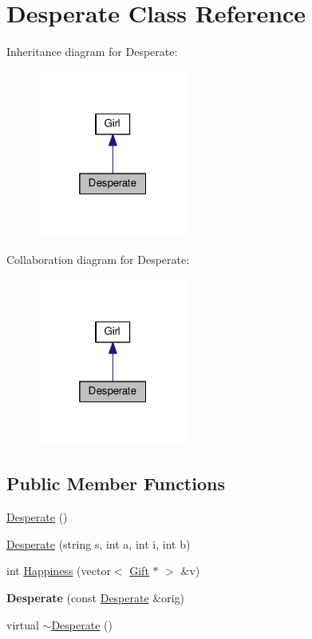 \hypertarget{class_desperate}{\section{Desperate Class Reference}
\label{class_desperate}
}


Inheritance diagram for Desperate\-:
\nopagebreak
\begin{figure}[H]
\begin{center}
\leavevmode
\includegraphics[width=140pt]{class_desperate__inherit__graph}
\end{center}
\end{figure}


Collaboration diagram for Desperate\-:
\nopagebreak
\begin{figure}[H]
\begin{center}
\leavevmode
\includegraphics[width=140pt]{class_desperate__coll__graph}
\end{center}
\end{figure}
\subsection*{Public Member Functions}
\begin{DoxyCompactItemize}
\item 
\hyperlink{class_desperate_a5a966ea58805cde02bbef8ce14fc1113}{Desperate} ()
\item 
\hyperlink{class_desperate_aac873bd417b8de2eab9ca2ed5d50a482}{Desperate} (string s, int a, int i, int b)
\item 
int \hyperlink{class_desperate_ae51a841b9720b3068c7c35b4ad53604f}{Happiness} (vector$<$ \hyperlink{class_gift}{Gift} $\ast$ $>$ \&v)
\item 
\hypertarget{class_desperate_a992a359206f71044233d89c3eca11137}{{\bfseries Desperate} (const \hyperlink{class_desperate}{Desperate} \&orig)}\label{class_desperate_a992a359206f71044233d89c3eca11137}

\item 
virtual \hyperlink{class_desperate_aa6bb2e0d2cf4378f827414a689c41d54}{$\sim$\-Desperate} ()
\end{DoxyCompactItemize}
